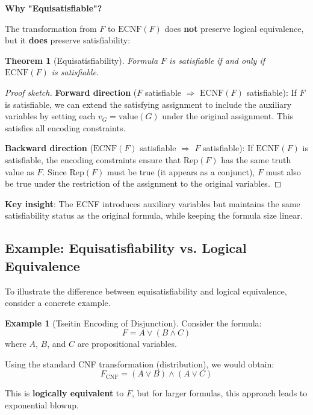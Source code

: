 \documentclass[11pt,a4paper]{article}
\theoremstyle{definition}
\newtheorem{example}{Example}[section]
\theoremstyle{plain}
\newtheorem{theorem}{Theorem}[section]
\theoremstyle{remark}
\begin{document}
\textbf{Why "Equisatisfiable"?}

The transformation from $F$ to $\text{ECNF}(F)$ does \textbf{not} preserve logical equivalence, but it \textbf{does} preserve satisfiability:

\begin{tcolorbox}[colback=yellow!10!white,colframe=yellow!75!black,title=\textbf{Equisatisfiability Theorem}]
\begin{theorem}[Equisatisfiability]
Formula $F$ is satisfiable if and only if $\text{ECNF}(F)$ is satisfiable.
\end{theorem}
\end{tcolorbox}

\begin{proof}[Proof sketch]
\textbf{Forward direction} ($F$ satisfiable $\Rightarrow$ $\text{ECNF}(F)$ satisfiable):
If $F$ is satisfiable, we can extend the satisfying assignment to include the auxiliary variables by setting each $v_G = \text{value}(G)$ under the original assignment. This satisfies all encoding constraints.

\textbf{Backward direction} ($\text{ECNF}(F)$ satisfiable $\Rightarrow$ $F$ satisfiable):
If $\text{ECNF}(F)$ is satisfiable, the encoding constraints ensure that $\text{Rep}(F)$ has the same truth value as $F$. Since $\text{Rep}(F)$ must be true (it appears as a conjunct), $F$ must also be true under the restriction of the assignment to the original variables.
\end{proof}

\textbf{Key insight}: The ECNF introduces auxiliary variables but maintains the same satisfiability status as the original formula, while keeping the formula size linear.

\subsection{Example: Equisatisfiability vs. Logical Equivalence}

To illustrate the difference between equisatisfiability and logical equivalence, consider a concrete example.

\begin{example}[Tseitin Encoding of Disjunction]
Consider the formula:
\[
F = A \lor (B \land C)
\]
where $A$, $B$, and $C$ are propositional variables.

Using the standard CNF transformation (distribution), we would obtain:
\[
F_{\text{CNF}} = (A \lor B) \land (A \lor C)
\]

This is \textbf{logically equivalent} to $F$, but for larger formulas, this approach leads to exponential blowup.
\end{example}
\end{document}
